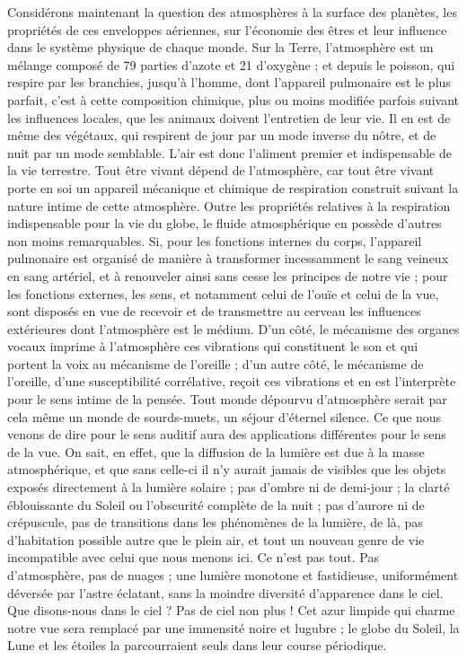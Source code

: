 \documentclass[a4paper, 11pt, oneside]{article}
\begin{document}
Considérons maintenant la question des atmosphères à la surface des planètes, les propriétés de ces enveloppes aériennes, sur l'économie des êtres et leur influence dans le système physique de chaque monde. Sur la Terre, l'atmosphère est un mélange composé de 79 parties d'azote et 21 d'oxygène ; et depuis le poisson, qui respire par les branchies, jusqu'à l'homme, dont l'appareil pulmonaire est le plus parfait, c'est à cette composition chimique, plus ou moins modifiée parfois suivant les influences locales, que les animaux doivent l'entretien de leur vie. Il en est de même des végétaux, qui respirent de jour par un mode inverse du nôtre, et de nuit par un mode semblable. L'air est donc l'aliment premier et indispensable de la vie terrestre. Tout être vivant dépend de l'atmosphère, car tout être vivant porte en soi un appareil mécanique et chimique de respiration construit suivant la nature intime de cette atmosphère. Outre les propriétés relatives à la respiration indispensable pour la vie du globe, le fluide atmosphérique en possède d'autres non moins remarquables. Si, pour les fonctions internes du corps, l'appareil pulmonaire est organisé de manière à transformer incessamment le sang veineux en sang artériel, et à renouveler ainsi sans cesse les principes de notre vie ; pour les fonctions externes, les sens, et notamment celui de l'ouïe et celui de la vue, sont disposés en vue de recevoir et de transmettre au cerveau les influences extérieures dont l'atmosphère est le médium. D'un côté, le mécanisme des organes vocaux imprime à l'atmosphère ces vibrations qui constituent le son et qui portent la voix au mécanisme de l'oreille ; d'un autre côté, le mécanisme de l'oreille, d'une susceptibilité corrélative, reçoit ces vibrations et en est l'interprète pour le sens intime de la pensée. Tout monde dépourvu d'atmosphère serait par cela même un monde de sourds-muets, un séjour d'éternel silence. Ce que nous venons de dire pour le sens auditif aura des applications différentes pour le sens de la vue. On sait, en effet, que la diffusion de la lumière est due à la masse atmosphérique, et que sans celle-ci il n'y aurait jamais de visibles que les objets exposés directement à la lumière solaire ; pas d'ombre ni de demi-jour ; la clarté éblouissante du Soleil ou l'obscurité complète de la nuit ; pas d'aurore ni de crépuscule, pas de transitions dans les phénomènes de la lumière, de là, pas d'habitation possible autre que le plein air, et tout un nouveau genre de vie incompatible avec celui que nous menons ici. Ce n'est pas tout. Pas d'atmosphère, pas de nuages ; une lumière monotone et fastidieuse, uniformément déversée par l'astre éclatant, sans la moindre diversité d'apparence dans le ciel. Que disons-nous dans le ciel ? Pas de ciel non plus ! Cet azur limpide qui charme notre vue sera remplacé par une immensité noire et lugubre ; le globe du Soleil, la Lune et les étoiles la parcourraient seuls dans leur course périodique.
\end{document}
